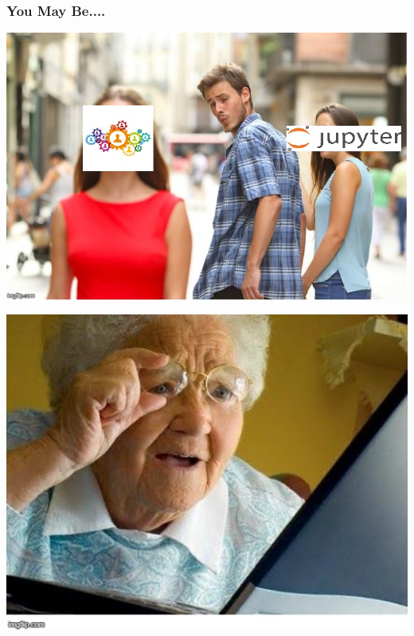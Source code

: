\documentclass[xcolor={dvipsnames}]{beamer}
\newcommand{\ft}{\frametitle}
\begin{document}
\begin{frame}
\ft{You May Be....}
\pause
\begin{minipage}{.45\textwidth}
\begin{center}
	\includegraphics[width = \textwidth]{DistactedJupyterGears.jpg}
\end{center}
\end{minipage}
\pause
\begin{minipage}{.45\textwidth}
\begin{center}
	\includegraphics[width = \textwidth]{OldWomanComputerMeme.jpg}
\end{center}
\end{minipage}
\end{frame}
\end{document}
